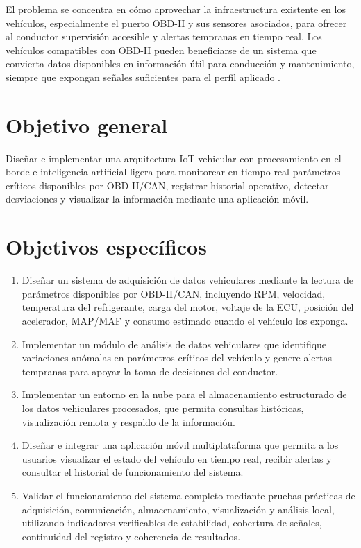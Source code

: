\documentclass[12pt,letterpaper]{report}
\begin{document}
El problema se concentra en cómo aprovechar la infraestructura existente en los vehículos, especialmente el puerto OBD-II y sus sensores asociados, para ofrecer al conductor supervisión accesible y alertas tempranas en tiempo real. Los vehículos compatibles con OBD-II pueden beneficiarse de un sistema que convierta datos disponibles en información útil para conducción y mantenimiento, siempre que expongan señales suficientes para el perfil aplicado \cite{mahale2025_review_predictive_maintenance}.

\section{Objetivo general}
Diseñar e implementar una arquitectura IoT vehicular con procesamiento en el borde e inteligencia artificial ligera para monitorear en tiempo real parámetros críticos disponibles por OBD-II/CAN, registrar historial operativo, detectar desviaciones y visualizar la información mediante una aplicación móvil.

\section{Objetivos específicos}

\begin{enumerate}
\item Diseñar un sistema de adquisición de datos vehiculares mediante la lectura de parámetros disponibles por OBD-II/CAN, incluyendo RPM, velocidad, temperatura del refrigerante, carga del motor, voltaje de la ECU, posición del acelerador, MAP/MAF y consumo estimado cuando el vehículo los exponga.
\item Implementar un módulo de análisis de datos vehiculares que identifique variaciones anómalas en parámetros críticos del vehículo y genere alertas tempranas para apoyar la toma de decisiones del conductor.
\item Implementar un entorno en la nube para el almacenamiento estructurado de los datos vehiculares procesados, que permita consultas históricas, visualización remota y respaldo de la información.
\item Diseñar e integrar una aplicación móvil multiplataforma que permita a los usuarios visualizar el estado del vehículo en tiempo real, recibir alertas y consultar el historial de funcionamiento del sistema.
\item Validar el funcionamiento del sistema completo mediante pruebas prácticas de adquisición, comunicación, almacenamiento, visualización y análisis local, utilizando indicadores verificables de estabilidad, cobertura de señales, continuidad del registro y coherencia de resultados.
\end{enumerate}
\end{document}

